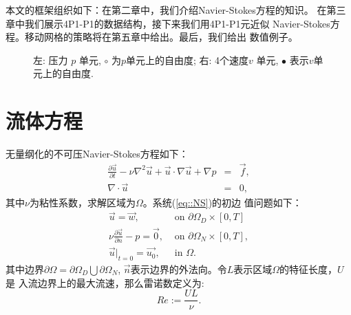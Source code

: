 \documentclass{report}
\theoremstyle{Remark}
\begin{document}
     本文的框架组织如下：在第二章中，我们介绍Navier-Stokes方程的知识。
     在第三章中我们展示4P1-P1的数据结构，接下来我们用4P1-P1元近似
     Navier-Stokes方程。移动网格的策略将在第五章中给出。最后，我们给出
     数值例子。

    \begin{figure}
      \centering    
      \caption{左: 压力 $p$ 单元, $\circ$ 为$p$单元上的自由度; 
               右: 4个速度$v$ 单元, $\bullet$ 表示$v$单元上的自由度.}
      \label{fig::p-v}       
    \end{figure}

\chapter{流体方程}
    无量纲化的不可压Navier-Stokes方程如下：
    \begin{equation}
      \begin{array}{rcl}
        \frac{\partial \vec{u}}{\partial t}-\nu \nabla^2 \vec{u} +
        \vec{u} \cdot \nabla \vec{u} + \nabla p & =
        & \vec{f},\\
        \nabla \cdot \vec{u} & = & 0,
      \end{array}
      \label{eq::NS}
    \end{equation}
    其中$\nu$为粘性系数，求解区域为$\Omega$。系统(\ref{eq::NS})的初边
    值问题如下：
    \begin{equation}
      \begin{array}{ll}
        \vec{u} = \vec{w},& \mbox{ on } \partial \Omega_D \times [0,
        T]\\
        \nu \displaystyle \frac{\partial \vec{u}}{\partial n} - p =
        \vec{0}, & \mbox{ on } \partial \Omega_N \times [0, T],  \\
        \vec{u}|_{t = 0} = \vec{u_0}, & \mbox{ in } \Omega. 
      \end{array}
      \label{eq::bc}
    \end{equation} 
    其中边界$\partial \Omega = \partial \Omega_D \bigcup \partial \Omega_N$,
    $\vec{n}$表示边界的外法向。令$L$表示区域$\Omega$的特征长度，$U$是
    入流边界上的最大流速，那么雷诺数定义为:
    \begin{equation}
      Re := \frac{UL}{\nu}.
    \end{equation}
\end{document}
